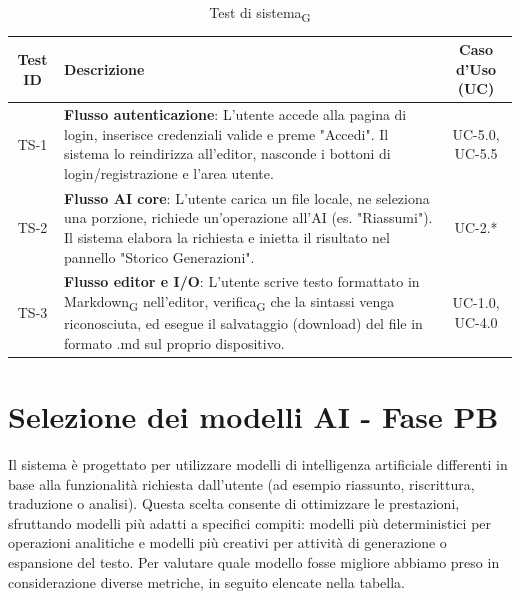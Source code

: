 \documentclass[11pt,a4paper]{article}
\newcommand{\gls}[1]{#1\textsubscript{G}}
\begin{document}
\begin{table}[H]
    \centering
    \small
    \begin{tabularx}{\textwidth}{|c|X|c|}
        \hline
        \textbf{Test ID} & \textbf{Descrizione} & \textbf{Caso d'Uso (UC)} \\
        \hline
        TS-1 & \textbf{Flusso autenticazione}: L'utente accede alla pagina di login, inserisce credenziali valide e preme "Accedi". Il sistema lo reindirizza all'editor, nasconde i bottoni di login/registrazione e l'area utente. & UC-5.0, UC-5.5 \\
        \hline
        TS-2 & \textbf{Flusso AI core}: L'utente carica un file locale, ne seleziona una porzione, richiede un'operazione all'AI (es. "Riassumi"). Il sistema elabora la richiesta e inietta il risultato nel pannello "Storico Generazioni". & UC-2.* \\
        \hline
        TS-3 & \textbf{Flusso editor e I/O}: L'utente scrive testo formattato in \gls{Markdown} nell'editor, \gls{verifica} che la sintassi venga riconosciuta, ed esegue il salvataggio (download) del file in formato .md sul proprio dispositivo. & UC-1.0, UC-4.0 \\
        \hline
    \end{tabularx}
    \caption{\gls{Test di sistema}}
\end{table}

\newpage

\section{Selezione dei modelli AI - Fase PB}
Il sistema è progettato per utilizzare modelli di intelligenza artificiale differenti in base alla funzionalità richiesta dall’utente (ad esempio riassunto, riscrittura, traduzione o analisi). Questa scelta consente di ottimizzare le prestazioni, sfruttando modelli più adatti a specifici compiti: modelli più deterministici per operazioni analitiche e modelli più creativi per attività di generazione o espansione del testo.
Per valutare quale modello fosse migliore abbiamo preso in considerazione diverse metriche, in seguito elencate nella tabella.
\end{document}
